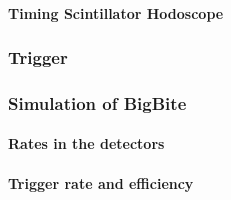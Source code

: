 \paragraph{Timing Scintillator Hodoscope}

\subsubsection{Trigger}

\subsubsection{Simulation of BigBite}

\paragraph{Rates in the detectors}

\paragraph{Trigger rate and efficiency}